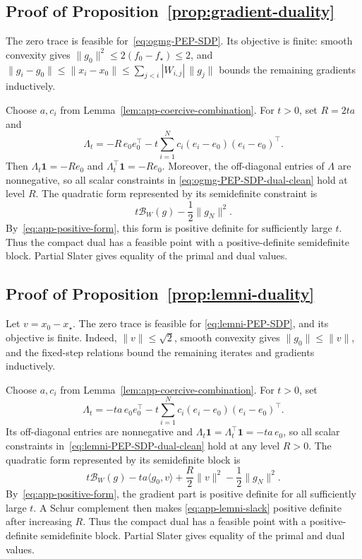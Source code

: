 \documentclass[11pt]{article}
\begin{document}
\subsection{Proof of Proposition~\ref{prop:gradient-duality}}
\label{app:gradient-duality}
The zero trace is feasible for~\eqref{eq:ogmg-PEP-SDP}. Its
objective is finite: smooth convexity gives
$\|g_0\|^2\leq2(f_0-f_\star)\leq2$, and $\|g_i-g_0\|\leq\|x_i-x_0\|
 \leq\sum_{j<i}|W_{i,j}|\,\|g_j\|$
bounds the remaining gradients inductively.

Choose $a,c_i$ from Lemma~\ref{lem:app-coercive-combination}. For $t>0$, set
$R=2ta$ and
\[
\Lambda_t
=-R\,e_0e_0^\top
-t\sum_{i=1}^Nc_i(e_i-e_0)(e_i-e_0)^\top.
\]
Then $\Lambda_t\mathbf1=-R e_0$ and $\Lambda_t^\top\mathbf1=-R e_0$.
Moreover, the off-diagonal entries of $\Lambda$ are nonnegative, so all scalar constraints in
\eqref{eq:ogmg-PEP-SDP-dual-clean} hold at level $R$. The quadratic form
represented by its semidefinite constraint is
\[
    t\mathcal B_W(g)-\frac12\|g_N\|^2.
\]
By~\eqref{eq:app-positive-form}, this form is positive definite for
sufficiently large $t$. Thus the compact dual has a feasible point with a positive-definite
semidefinite block. Partial Slater gives equality of the primal and dual
values.

\subsection{Proof of Proposition~\ref{prop:lemni-duality}}
\label{app:lemni-duality}
Let $v=x_0-x_\star$. The zero trace is feasible for
\eqref{eq:lemni-PEP-SDP}, and its objective is finite. Indeed,
$\|v\|\leq\sqrt2$, smooth convexity gives $\|g_0\|\leq\|v\|$, and the
fixed-step relations bound the remaining iterates and gradients inductively.

Choose $a,c_i$ from Lemma~\ref{lem:app-coercive-combination}. For $t>0$, set
\[
\Lambda_t
=-ta\,e_0e_0^\top
-t\sum_{i=1}^Nc_i(e_i-e_0)(e_i-e_0)^\top.
\]
Its off-diagonal entries are nonnegative and $\Lambda_t\mathbf1
    =\Lambda_t^\top\mathbf1
    =-ta\,e_0$,
so all scalar constraints in~\eqref{eq:lemni-PEP-SDP-dual-clean} hold at any
level $R>0$. The quadratic form represented by its semidefinite block is
\begin{equation}\label{eq:app-lemni-slack}
    t\mathcal B_W(g)
    -ta\langle g_0,v\rangle
    +\frac R2\|v\|^2
    -\frac12\|g_N\|^2.
\end{equation}
By~\eqref{eq:app-positive-form}, the gradient part is positive definite for
all sufficiently large $t$. A Schur complement then makes
\eqref{eq:app-lemni-slack} positive definite after increasing $R$. Thus the
compact dual has a feasible point with a positive-definite semidefinite block.
Partial Slater gives equality of the primal and dual values.
\end{document}
